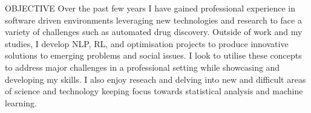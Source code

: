 
\begin{ResumeSection}{OBJECTIVE}
    Over the past few years I have gained professional experience in software driven environments leveraging new technologies and research to face a variety of challenges such as automated drug discovery. Outside of work and my studies, I develop NLP, RL, and optimisation projects to produce innovative solutions to emerging problems and social issues. I look to utilise these concepts to address major challenges in a professional setting while showcasing and developing my skills. I also enjoy reseach and delving into new and difficult areas of science and technology keeping focus towards statistical analysis and machine learning.
\end{ResumeSection}